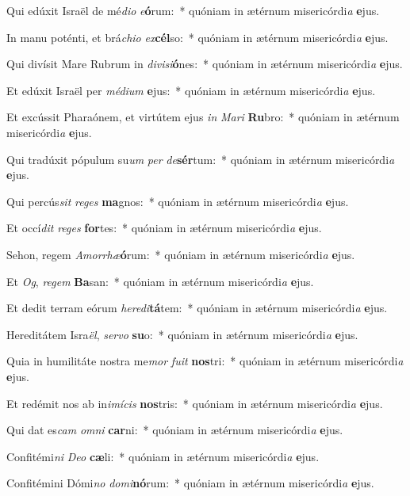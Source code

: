 \item Qui edúxit Israël de mé\textit{di}\textit{o} \textit{e}\textbf{ó}rum:~* quóniam in ætérnum misericórdi\textit{a} \textbf{e}jus.
\item In manu poténti, et brá\textit{chi}\textit{o} \textit{ex}\textbf{cél}so:~* quóniam in ætérnum misericórdi\textit{a} \textbf{e}jus.
\item Qui divísit Mare Rubrum in \textit{di}\textit{vi}\textit{si}\textbf{ó}nes:~* quóniam in ætérnum misericórdi\textit{a} \textbf{e}jus.
\item Et edúxit Israël per \textit{mé}\textit{di}\textit{um} \textbf{e}jus:~* quóniam in ætérnum misericórdi\textit{a} \textbf{e}jus.
\item Et excússit Pharaónem, et virtútem ejus \textit{in} \textit{Ma}\textit{ri} \textbf{Ru}bro:~* quóniam in ætérnum misericórdi\textit{a} \textbf{e}jus.
\item Qui tradúxit pópulum su\textit{um} \textit{per} \textit{de}\textbf{sér}tum:~* quóniam in ætérnum misericórdi\textit{a} \textbf{e}jus.
\item Qui percús\textit{sit} \textit{re}\textit{ges} \textbf{ma}gnos:~* quóniam in ætérnum misericórdi\textit{a} \textbf{e}jus.
\item Et occí\textit{dit} \textit{re}\textit{ges} \textbf{for}tes:~* quóniam in ætérnum misericórdi\textit{a} \textbf{e}jus.
\item Sehon, regem \textit{A}\textit{mor}\textit{rhæ}\textbf{ó}rum:~* quóniam in ætérnum misericórdi\textit{a} \textbf{e}jus.
\item Et \textit{Og}, \textit{re}\textit{gem} \textbf{Ba}san:~* quóniam in ætérnum misericórdi\textit{a} \textbf{e}jus.
\item Et dedit terram eórum \textit{he}\textit{re}\textit{di}\textbf{tá}tem:~* quóniam in ætérnum misericórdi\textit{a} \textbf{e}jus.
\item Hereditátem Isra\textit{ël}, \textit{ser}\textit{vo} \textbf{su}o:~* quóniam in ætérnum misericórdi\textit{a} \textbf{e}jus.
\item Quia in humilitáte nostra me\textit{mor} \textit{fu}\textit{it} \textbf{nos}tri:~* quóniam in ætérnum misericórdi\textit{a} \textbf{e}jus.
\item Et redémit nos ab in\textit{i}\textit{mí}\textit{cis} \textbf{nos}tris:~* quóniam in ætérnum misericórdi\textit{a} \textbf{e}jus.
\item Qui dat es\textit{cam} \textit{om}\textit{ni} \textbf{car}ni:~* quóniam in ætérnum misericórdi\textit{a} \textbf{e}jus.
\item Confitémi\textit{ni} \textit{De}\textit{o} \textbf{cæ}li:~* quóniam in ætérnum misericórdi\textit{a} \textbf{e}jus.
\item Confitémini Dómi\textit{no} \textit{do}\textit{mi}\textbf{nó}rum:~* quóniam in ætérnum misericórdi\textit{a} \textbf{e}jus.
